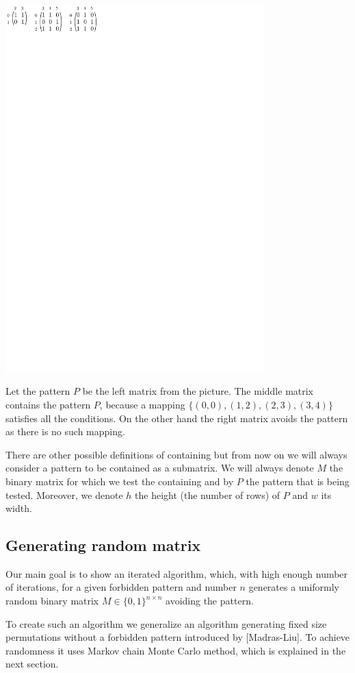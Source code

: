 \centerline{\mbox{\includegraphics[width=100mm]{../img/avoiding.pdf}}}

Let the pattern $P$ be the left matrix from the picture. The middle matrix contains the pattern $P$, because a mapping $\{(0,0),(1,2),(2,3),(3,4)\}$ satisfies all the conditions. On the other hand the right matrix avoids the pattern as there is no such mapping.

There are other possible definitions of containing but from now on we will always consider a pattern to be contained as a submatrix. We will always denote $M$ the binary matrix for which we test the containing and by $P$ the pattern that is being tested. Moreover, we denote $h$ the height (the number of rows) of $P$ and $w$ its width.

\subsection*{Generating random matrix}
Our main goal is to show an iterated algorithm, which, with high enough number of iterations, for a given forbidden pattern and number $n$ generates a uniformly random binary matrix $M\in\{0,1\}^{n\times n}$ avoiding the pattern.

To create such an algorithm we generalize an algorithm generating fixed size permutations without a forbidden pattern introduced by [Madras-Liu]. To achieve randomness it uses Markov chain Monte Carlo method, which is explained in the next section.

